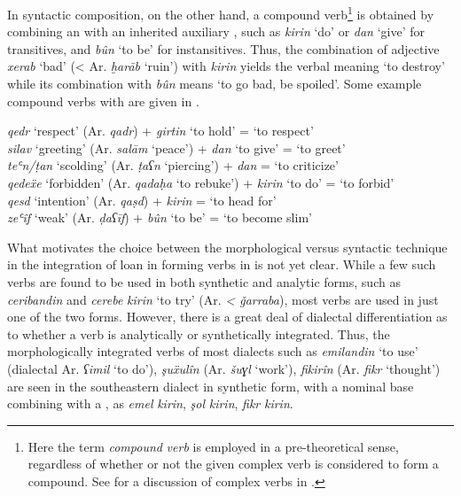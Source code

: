 \documentclass[output=paper]{langsci/langscibook}
\begin{document}
In syntactic composition, on the other hand, a compound verb\footnote{Here the term \textit{compound} \textit{verb} is employed in a pre-theoretical sense, regardless of whether or not the given complex verb is considered to form a compound. See \citet{Haig2002} for a discussion of complex verbs in .}  is obtained by combining an   with an inherited auxiliary , such as \textit{kirin} ‘do’ or \textit{dan} ‘give’ for transitives, and \textit{bûn} ‘to be’ for instansitives. Thus, the combination of  adjective  \textit{xerab} ‘bad’ (< Ar. \textit{ḫarāb} ‘ruin’) with \textit{kirin} yields the verbal meaning ‘to destroy’ while its combination with \textit{bûn} means ‘to go bad, be spoiled’. Some example compound verbs with   are given in .

\ea\label{compound}
\textit{qedr} ‘respect’              (Ar. \textit{qadr})                +   \textit{girtin} ‘to hold’    =  ‘to respect’     \\
\textit{silav} ‘greeting’            (Ar. \textit{salām} ‘peace’)       +   \textit{dan} ‘to give’       =   ‘to greet’      \\
\textit{teʿn\slash ṭan} ‘scolding’   (Ar. \textit{ṭaʕn} ‘piercing’)     + \textit{dan}                   =   ‘to criticize’  \\
\textit{qedeẍe} ‘forbidden’          (Ar. \textit{qadaḥa} ‘to rebuke’)  +   \textit{kirin} ‘to do’       =   ‘to forbid’     \\
\textit{qesd} ‘intention’            (Ar. \textit{qaṣd})                +   \textit{kirin}               =   ‘to head for’   \\
\textit{zeʿîf} ‘weak’                (Ar. \textit{ḍaʕīf})               +   \textit{bûn} ‘to be’         =   ‘to become slim’
\z

What motivates the choice between the morphological versus syntactic technique in the integration of  loan  in forming verbs in  is not yet clear. While a few such verbs are found to be used in both synthetic and analytic forms, such as \textit{ceribandin} and \textit{cerebe} \textit{kirin} ‘to try’ (Ar. \textit{< ǧarraba}), most verbs are used in just one of the two forms. However, there is a great deal of dialectal differentiation as to whether a verb is analytically or synthetically integrated. Thus, the morphologically integrated verbs of most   dialects such as \textit{emilandin} ‘to use’ (dialectal Ar. \textit{ʕimil} ‘to do’), \textit{şuẍulîn} (Ar. \textit{šuɣl} ‘work’), \textit{fikirîn} (Ar. \textit{fikr} ‘thought’) are seen in the southeastern  dialect in synthetic form, with a nominal base combining with a , as \textit{emel} \textit{kirin}, \textit{şol} \textit{kirin}, \textit{fikr} \textit{kirin}.   
\end{document}

